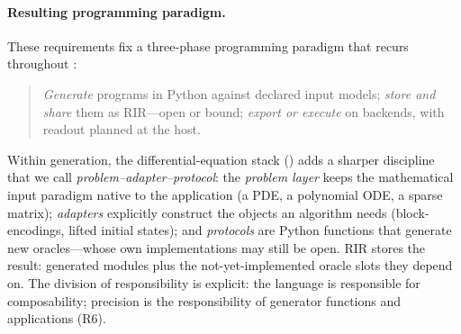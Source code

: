 \paragraph{Resulting programming paradigm.}
These requirements fix a three-phase programming paradigm that recurs
throughout \pqlang{}:
\begin{quote}
\emph{Generate} programs in Python against declared input models;
\emph{store and share} them as RIR---open or bound;
\emph{export or execute} on backends, with readout planned at the host.
\end{quote}
Within generation, the differential-equation stack
() adds a sharper discipline that we call
\emph{problem--adapter--protocol}: the \emph{problem layer} keeps the
mathematical input paradigm native to the application (a PDE, a polynomial
ODE, a sparse matrix); \emph{adapters} explicitly construct the objects an
algorithm needs (block-encodings, lifted initial states); and \emph{protocols}
are Python functions that generate new oracles---whose own implementations
may still be open.  RIR stores the result: generated modules plus the
not-yet-implemented oracle slots they depend on.  The division of
responsibility is explicit: the language is responsible for composability;
precision is the responsibility of generator functions and applications
(R6).
